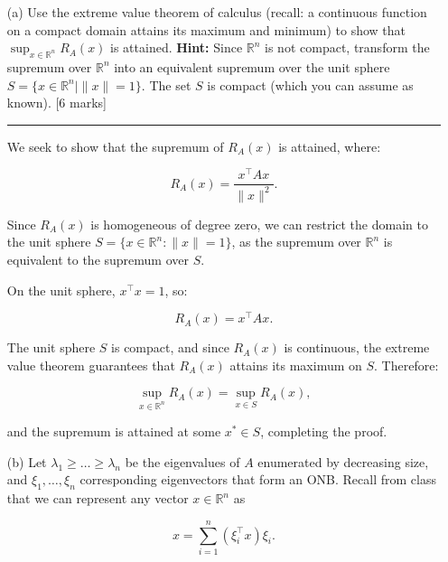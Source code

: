 \documentclass{article}
\begin{document}
\begin{enumerate}
    \item[(a)] Use the extreme value theorem of calculus (recall: a continuous function on a compact domain attains its maximum and minimum) to show that \( \sup_{x \in \mathbb{R}^n} R_A(x) \) is attained. \textbf{Hint:} Since \( \mathbb{R}^n \) is not compact, transform the supremum over \( \mathbb{R}^n \) into an equivalent supremum over the unit sphere \( S = \{ x \in \mathbb{R}^n \mid \|x\| = 1 \} \). The set \( S \) is compact (which you can assume as known). [6 marks]

    \noindent\textcolor{gray}{\rule{0.1\linewidth}{0.4pt}}
    \vspace{10pt}

    We seek to show that the supremum of \( R_A(x) \) is attained, where:

    \begin{equation}
    R_A(x) = \frac{x^\top A x}{\|x\|^2}.
    \end{equation}
    
    Since \( R_A(x) \) is homogeneous of degree zero, we can restrict the domain to the unit sphere \( S = \{ x \in \mathbb{R}^n : \|x\| = 1 \} \), as the supremum over \( \mathbb{R}^n \) is equivalent to the supremum over \( S \).
    
    On the unit sphere, \( x^\top x = 1 \), so:
    
    \begin{equation}
    R_A(x) = x^\top A x.
    \end{equation}
    
    The unit sphere \( S \) is compact, and since \( R_A(x) \) is continuous, the extreme value theorem guarantees that \( R_A(x) \) attains its maximum on \( S \). Therefore:
    
    \begin{equation}
    \sup_{x \in \mathbb{R}^n} R_A(x) = \sup_{x \in S} R_A(x),
    \end{equation}
    
    and the supremum is attained at some \( x^* \in S \), completing the proof.
    

    \item[(b)] Let \( \lambda_1 \geq \dots \geq \lambda_n \) be the eigenvalues of \( A \) enumerated by decreasing size, and \( \xi_1, \dots, \xi_n \) corresponding eigenvectors that form an ONB. Recall from class that we can represent any vector \( x \in \mathbb{R}^n \) as

    \[
    x = \sum_{i=1}^n (\xi_i^\top x) \xi_i .
    \]


\end{enumerate}
\end{document}
